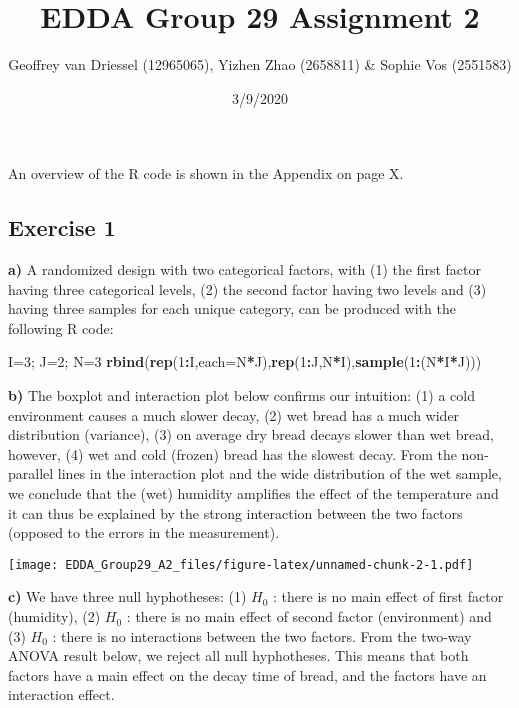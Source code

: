 \documentclass[]{article}
\title{\textbf{EDDA Group 29 Assignment 2}}
\author{Geoffrey van Driessel (12965065), Yizhen Zhao (2658811) \& Sophie Vos
(2551583)}
\date{3/9/2020}
\newenvironment{Shaded}{\begin{snugshade}}{\end{snugshade}}
\newcommand{\DataTypeTok}[1]{\textcolor[rgb]{0.13,0.29,0.53}{#1}}
\newcommand{\DecValTok}[1]{\textcolor[rgb]{0.00,0.00,0.81}{#1}}
\newcommand{\KeywordTok}[1]{\textcolor[rgb]{0.13,0.29,0.53}{\textbf{#1}}}
\newcommand{\NormalTok}[1]{#1}
\newcommand{\OperatorTok}[1]{\textcolor[rgb]{0.81,0.36,0.00}{\textbf{#1}}}
\begin{document}
\maketitle

An overview of the R code is shown in the Appendix on page X.

\hypertarget{exercise-1}{%
\subsection{Exercise 1}\label{exercise-1}}

\textbf{a)} A randomized design with two categorical factors, with (1)
the first factor having three categorical levels, (2) the second factor
having two levels and (3) having three samples for each unique category,
can be produced with the following R code:

\begin{Shaded}
\begin{Highlighting}[]
\NormalTok{I=}\DecValTok{3}\NormalTok{; J=}\DecValTok{2}\NormalTok{; N=}\DecValTok{3}
\KeywordTok{rbind}\NormalTok{(}\KeywordTok{rep}\NormalTok{(}\DecValTok{1}\OperatorTok{:}\NormalTok{I,}\DataTypeTok{each=}\NormalTok{N}\OperatorTok{*}\NormalTok{J),}\KeywordTok{rep}\NormalTok{(}\DecValTok{1}\OperatorTok{:}\NormalTok{J,N}\OperatorTok{*}\NormalTok{I),}\KeywordTok{sample}\NormalTok{(}\DecValTok{1}\OperatorTok{:}\NormalTok{(N}\OperatorTok{*}\NormalTok{I}\OperatorTok{*}\NormalTok{J)))}
\end{Highlighting}
\end{Shaded}

\textbf{b)} The boxplot and interaction plot below confirms our
intuition: (1) a cold environment causes a much slower decay, (2) wet
bread has a much wider distribution (variance), (3) on average dry bread
decays slower than wet bread, however, (4) wet and cold (frozen) bread
has the slowest decay. From the non-parallel lines in the interaction
plot and the wide distribution of the wet sample, we conclude that the
(wet) humidity amplifies the effect of the temperature and it can thus
be explained by the strong interaction between the two factors (opposed
to the errors in the measurement).

\texttt{[image: EDDA\_Group29\_A2\_files/figure-latex/unnamed-chunk-2-1.pdf]}

\textbf{c)} We have three null hyphotheses: (1) \(H_0\) : there is no
main effect of first factor (humidity), (2) \(H_0\) : there is no main
effect of second factor (environment) and (3) \(H_0\) : there is no
interactions between the two factors. From the two-way ANOVA result
below, we reject all null hyphotheses. This means that both factors have
a main effect on the decay time of bread, and the factors have an
interaction effect.
\end{document}
